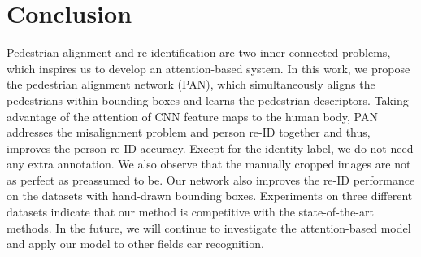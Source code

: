 \section{Conclusion} \label{conclusion}
Pedestrian alignment and re-identification are two inner-connected problems, which inspires us to develop an attention-based system. In this work, we propose the pedestrian alignment network (PAN), which simultaneously aligns the pedestrians within bounding boxes and learns the pedestrian descriptors. Taking advantage of the attention of CNN feature maps to the human body, PAN addresses the misalignment problem and person re-ID together and thus, improves the person re-ID accuracy. Except for the identity label, we do not need any extra annotation. We also observe that the manually cropped images are not as perfect as preassumed to be. Our network also improves the re-ID performance on the datasets with hand-drawn bounding boxes. Experiments on three different datasets indicate that our method is competitive with the state-of-the-art methods. In the future, we will continue to investigate the attention-based model and apply our model to other fields \ie car recognition.  


 
   



